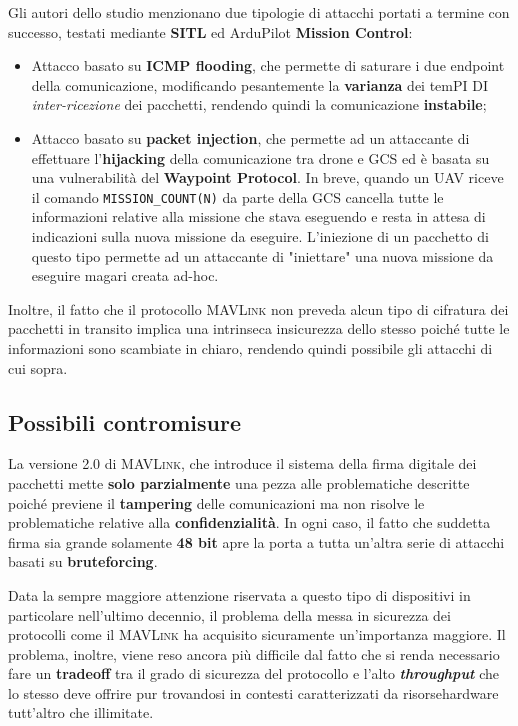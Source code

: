 \documentclass[a4paper, 12pt, oneside]{article}
\theoremstyle{definition}
\begin{document}
Gli autori dello studio menzionano due tipologie di attacchi portati a termine con successo, testati mediante \textbf{SITL} ed ArduPilot \textbf{Mission Control}:

\begin{itemize}
    \item Attacco basato su \textbf{ICMP flooding}, che permette di saturare i due endpoint della comunicazione, modificando pesantemente la \textbf{varianza} dei temPI DI \textit{inter-ricezione} dei pacchetti, rendendo quindi la comunicazione \textbf{instabile};
    \item Attacco basato su \textbf{packet injection}, che permette ad un attaccante di effettuare l'\textbf{hijacking} della comunicazione tra drone e GCS ed è basata su una vulnerabilità del \textbf{Waypoint Protocol}. In breve, quando un UAV riceve il comando \texttt{MISSION\_COUNT(N)} da parte della GCS cancella tutte le informazioni relative alla missione che stava eseguendo e resta in attesa di indicazioni sulla nuova missione da eseguire. L'iniezione di un pacchetto di questo tipo permette ad un attaccante di "iniettare" una nuova missione da eseguire magari creata ad-hoc.
\end{itemize}

Inoltre, il fatto che il protocollo \textsc{MAVLink} non preveda alcun tipo di cifratura dei pacchetti in transito \cite{mavlink-no-encrypt} implica una intrinseca insicurezza dello stesso poiché tutte le informazioni sono scambiate in chiaro, rendendo quindi possibile gli attacchi di cui sopra.

\subsection{Possibili contromisure}
La versione 2.0 di \textsc{MAVLink}, che introduce il sistema della firma digitale dei pacchetti mette \textbf{solo parzialmente} una pezza alle problematiche descritte poiché previene il \textbf{tampering} delle comunicazioni ma non risolve le problematiche relative alla \textbf{confidenzialità}. In ogni caso, il fatto che suddetta firma sia grande solamente \textbf{48 bit} apre la porta a tutta un'altra serie di attacchi basati su \textbf{bruteforcing}.

Data la sempre maggiore attenzione riservata a questo tipo di dispositivi in particolare nell'ultimo decennio, il problema della messa in sicurezza dei protocolli come il \textsc{MAVLink} ha acquisito sicuramente un'importanza maggiore. Il problema, inoltre, viene reso ancora più difficile dal fatto che si renda necessario fare un \textbf{tradeoff} tra il grado di sicurezza del protocollo e l'alto \textbf{\textit{throughput}} che lo stesso deve offrire pur trovandosi in contesti caratterizzati da risorsehardware tutt'altro che illimitate.
\end{document}
